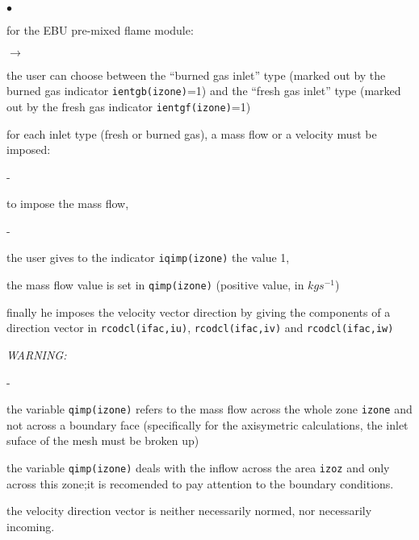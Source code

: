 {{{\begin{list}{$\bullet$}{}
       \item for the EBU pre-mixed flame module:
             \begin{list}{$\rightarrow$}{}
                    \item the user can choose between the ``burned gas
                          inlet'' type (marked out by the burned gas indicator
                          \texttt{ientgb(izone)}=1) and the
                          ``fresh gas inlet'' type (marked out by
                          the fresh gas indicator
                          \texttt{ientgf(izone)}=1)
                    \item for each inlet type (fresh or burned
                          gas), a mass flow or a velocity must be imposed:

                          \begin{list}{-}{}
                                 \item to impose the mass flow,
                                     \begin{list}{-}{}
                                       \item the user gives to
                                             the indicator
                                             \texttt{iqimp(izone)}
                                             the value 1,
                                       \item  the
                                             mass flow value is set in
                                             \texttt{qimp(izone)}
                                             (positive value, in $kgs^{-1}$)
                                       \item finally he imposes the
                                             velocity vector direction
                                             by giving the components of
                                             a direction vector in
                                             \texttt{rcodcl(ifac,iu)}, \texttt{rcodcl(ifac,iv)} and \texttt{rcodcl(ifac,iw)}
                                     \end{list}

{\em WARNING:
\begin{list}{-}{}
\item the variable \texttt{qimp(izone)} refers to the mass flow across the whole
      zone \texttt{izone} and not across a boundary face (specifically for the axisymetric calculations, the inlet suface of the mesh must be broken up)
\item the variable \texttt{qimp(izone)} deals with the inflow across the area \texttt{izoz} and only across this zone;it is recomended to pay attention to the boundary conditions.
\item the velocity direction vector is neither necessarily normed, nor
      necessarily incoming.
\end{list}}


\end{list}
\end{list}
\end{list}}}}
